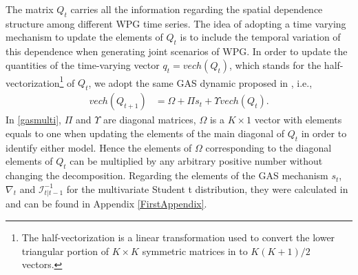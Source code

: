 \documentclass[a4paper]{IEEEtran}
\begin{document}

The matrix $Q_t$ carries all the information regarding the spatial dependence structure among different WPG time series. The idea of adopting a time varying mechanism to update the elements of $Q_t$ is to include the temporal variation of this dependence when generating joint scenarios of WPG. In order to update the quantities of the time-varying vector $q_t=vech(Q_{t})$, which stands for the half-vectorization\footnote{The half-vectorization is a linear transformation used to convert the lower triangular portion of $K\times K$ symmetric matrices in to $K(K+1)/2$ vectors.} of $Q_{t}$, we adopt the same GAS dynamic proposed in \cite{creal2011dynamic}, i.e.,
\begin{align}
vech(Q_{t+1}) &= \Omega + \Pi s_t + \Upsilon vech(Q_{t}). \label{gasmulti}
\end{align}
\noindent
In \eqref{gasmulti}, $\Pi$ and $\Upsilon$ are diagonal matrices, $\Omega$ is a $K \times 1$ vector with elements equals to one when updating the elements of the main diagonal of $Q_t$ in order to identify either model. Hence the elements of $\Omega$ corresponding to the diagonal elements of $Q_t$ can be multiplied by any arbitrary positive number without changing the decomposition. Regarding the elements of the GAS mechanism $s_t$, $\nabla_{t}$ and $\mathcal{I}_{t|t-1}^{-1}$ for the multivariate Student t distribution, they were calculated in \cite{creal2011dynamic} and can be found in Appendix \ref{FirstAppendix}.
\end{document}
